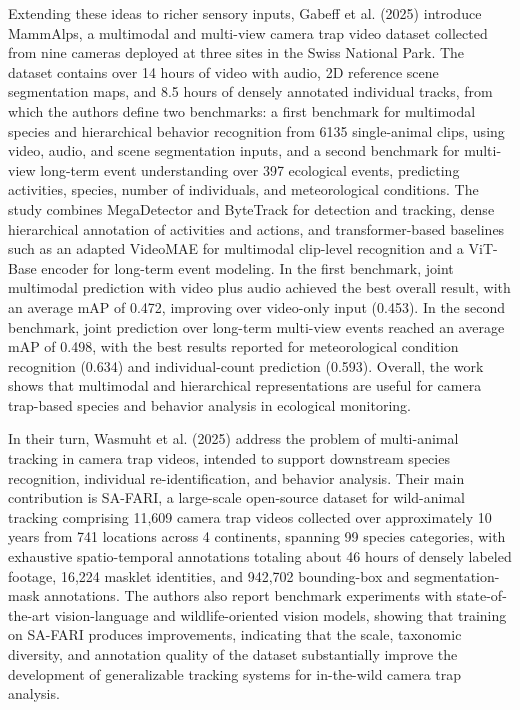 Extending these ideas to richer sensory inputs, Gabeff et al. (2025) \citep{gabeff2025mammalps} introduce MammAlps, a multimodal and multi-view camera trap video dataset collected from nine cameras deployed at three sites in the Swiss National Park. The dataset contains over 14 hours of video with audio, 2D reference scene segmentation maps, and 8.5 hours of densely annotated individual tracks, from which the authors define two benchmarks: a first benchmark for multimodal species and hierarchical behavior recognition from 6135 single-animal clips, using video, audio, and scene segmentation inputs, and a second benchmark for multi-view long-term event understanding over 397 ecological events, predicting activities, species, number of individuals, and meteorological conditions. The study combines MegaDetector and ByteTrack for detection and tracking, dense hierarchical annotation of activities and actions, and transformer-based baselines such as an adapted VideoMAE for multimodal clip-level recognition and a ViT-Base encoder for long-term event modeling. In the first benchmark, joint multimodal prediction with video plus audio achieved the best overall result, with an average mAP of 0.472, improving over video-only input (0.453). In the second benchmark, joint prediction over long-term multi-view events reached an average mAP of 0.498, with the best results reported for meteorological condition recognition (0.634) and individual-count prediction (0.593). Overall, the work shows that multimodal and hierarchical representations are useful for camera trap-based species and behavior analysis in ecological monitoring.

In their turn, Wasmuht et al. (2025) \citep{wasmuht2025sa} address the problem of multi-animal tracking in camera trap videos, intended to support downstream species recognition, individual re-identification, and behavior analysis. Their main contribution is SA-FARI, a large-scale open-source dataset for wild-animal tracking comprising 11,609 camera trap videos collected over approximately 10 years from 741 locations across 4 continents, spanning 99 species categories, with exhaustive spatio-temporal annotations totaling about 46 hours of densely labeled footage, 16,224 masklet identities, and 942,702 bounding-box and segmentation-mask annotations. The authors also report benchmark experiments with state-of-the-art vision-language and wildlife-oriented vision models, showing that training on SA-FARI produces improvements, indicating that the scale, taxonomic diversity, and annotation quality of the dataset substantially improve the development of generalizable tracking systems for in-the-wild camera trap analysis.

